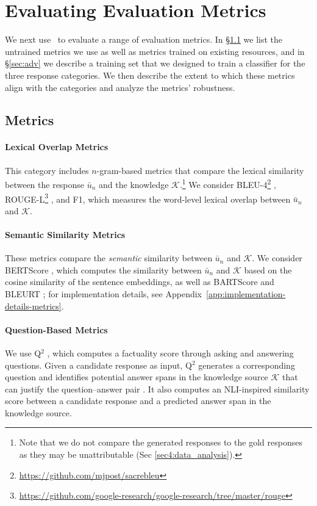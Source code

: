 \section{Evaluating Evaluation Metrics}
We next use \begindata \ to evaluate a range of evaluation metrics. In \S\ref{sec:metrics} we list the untrained metrics we use as well as metrics trained on existing resources, and in \S\ref{sec:adv} we describe a training set that we designed to train a classifier for the three response categories. We then describe the extent to which these metrics align with the \begindata{} categories and analyze the metrics' robustness. 

\subsection{Metrics}
\label{sec:metrics}

\paragraph{Lexical Overlap Metrics} This category includes $n$-gram-based metrics that compare the lexical similarity between the response $\bar{u}_{n}$ and the knowledge $\mathcal{K}$.\footnote{Note that we do not compare the generated responses to the gold responses as they may be unattributable (Sec \ref{sec4:data_analysis}).} We consider BLEU-4\footnote{\url{https://github.com/mjpost/sacrebleu}} \cite{papineni2002bleu}, ROUGE-L\footnote{\url{https://github.com/google-research/google-research/tree/master/rouge}} \cite{lin-2004-rouge}, and F1, which measures the word-level lexical overlap between $\bar{u}_{n}$ and  $\mathcal{K}$.

\paragraph{Semantic Similarity Metrics} These metrics compare the \textit{semantic} similarity between $\bar{u}_{n}$ and $\mathcal{K}$. We consider BERTScore \cite{Zhang*2020BERTScore:}, which computes the similarity between $\bar{u}_{n}$ and $\mathcal{K}$ based on the cosine similarity of the sentence embeddings, as well as BARTScore \cite{NEURIPS2021_e4d2b6e6} %
and BLEURT \cite{sellam2020bleurt}; %
for implementation details, see Appendix~\ref{app:implementation-details-metrics}. 

\paragraph{Question-Based Metrics} We use Q$^2$ \cite{honovich-etal-2021-q2}, which computes a factuality score through asking and answering questions. Given a candidate response as input, Q$^2$ generates a corresponding question and identifies potential answer spans in the knowledge source $\mathcal{K}$ that can justify the question--answer pair \cite{durmus-etal-2020-feqa, wang2020asking}. It also computes an NLI-inspired similarity score between a candidate response and a predicted answer span in the knowledge source.




